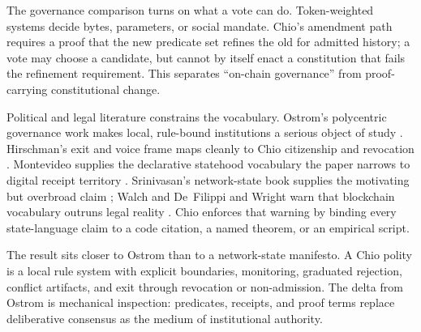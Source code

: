 The governance comparison turns on what a vote can do. Token-weighted systems decide bytes, parameters, or social mandate. Chio's amendment path requires a proof that the new predicate set refines the old for admitted history; a vote may choose a candidate, but cannot by itself enact a constitution that fails the refinement requirement. This separates ``on-chain governance'' from proof-carrying constitutional change.

Political and legal literature constrains the vocabulary. Ostrom's polycentric governance work makes local, rule-bound institutions a serious object of study \cite{ostrom1990commons,ostrom2009lecture}. Hirschman's exit and voice frame maps cleanly to Chio citizenship and revocation \cite{hirschman1970exit}. Montevideo supplies the declarative statehood vocabulary the paper narrows to digital receipt territory \cite{montevideo}. Srinivasan's network-state book supplies the motivating but overbroad claim \cite{srinivasanNetworkState}; Walch and De~Filippi and Wright warn that blockchain vocabulary outruns legal reality \cite{walch2017lexicon,defilippi2018blockchain}. Chio enforces that warning by binding every state-language claim to a code citation, a named theorem, or an empirical script.

The result sits closer to Ostrom than to a network-state manifesto. A Chio polity is a local rule system with explicit boundaries, monitoring, graduated rejection, conflict artifacts, and exit through revocation or non-admission. The delta from Ostrom is mechanical inspection: predicates, receipts, and proof terms replace deliberative consensus as the medium of institutional authority.
